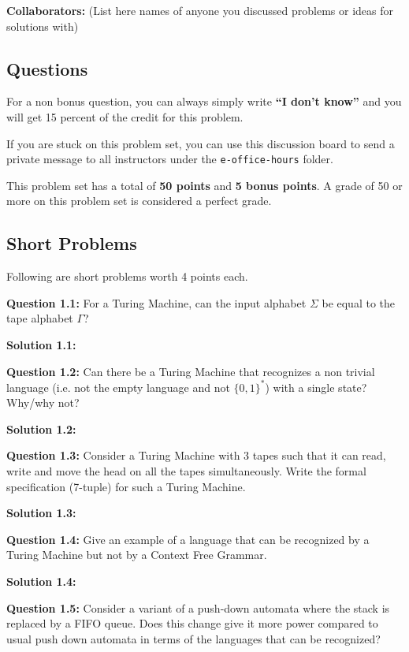 \documentclass[11pt]{article}
\begin{document}
\textbf{Collaborators:} (List here names of anyone you discussed
problems or ideas for solutions with)


\newpage


\subsection*{Questions}\label{questions}

For a non bonus question, you can always simply write
\textbf{``I don't know''} and you will get 15 percent of the credit for
this problem.

If you are stuck on this problem set, you can use this discussion board to send
a private message to all instructors under the \texttt{e-office-hours}
folder.

This problem set has a total of \textbf{50 points} and \textbf{5 bonus
points}. A grade of 50 or more on this problem set is considered a
perfect grade. 

\subsection{Short Problems}
Following are short problems worth 4 points each.

\textbf{Question 1.1:} For a Turing Machine, can the input alphabet \( \Sigma \) be equal to the tape alphabet \( \Gamma \)?

\textbf{Solution 1.1:}

\textbf{Question 1.2:} Can there be a Turing Machine that recognizes a non trivial language (i.e. not the empty language and not \(\{0,1\}^*\)) with a single state? Why/why not?

\textbf{Solution 1.2:}

\textbf{Question 1.3:} Consider a Turing Machine with 3 tapes such that it can read, write and move the head on all the tapes simultaneously. Write the formal specification (7-tuple) for such a Turing Machine.

\textbf{Solution 1.3:}

\textbf{Question 1.4:} Give an example of a language that can be recognized by a Turing Machine but not by a Context Free Grammar.

\textbf{Solution 1.4:}

\textbf{Question 1.5:} Consider a variant of a push-down automata where the stack is replaced by a FIFO queue. Does this change give it more power compared to usual push down automata in terms of the languages that can be recognized?
\end{document}
